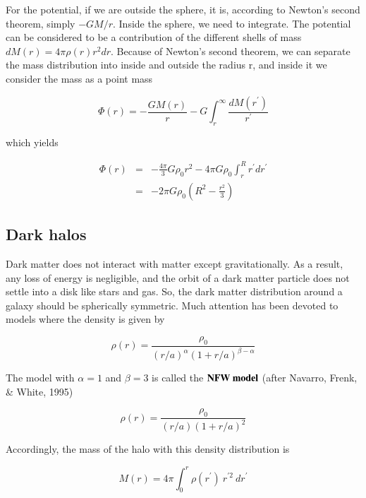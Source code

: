 For the potential, if we are outside the sphere, it is, according to Newton's second theorem, simply $-GM/r$. Inside the sphere, we need to integrate. The potential can be considered to be a contribution of the different shells of mass $dM(r) = 4\pi \rho(r) r^2 dr$. Because of Newton's second theorem, we can separate the mass distribution into inside and outside the radius r, and inside it we consider the mass as a point mass 

\begin{equation}
\varPhi(r) = -\frac{G M(r)}{r} - G\int_r^\infty \frac{dM(r^\prime)}{r^\prime} 
\end{equation}


which yields 


\begin{eqnarray}
\varPhi(r) &=& -\frac{4\pi}{3} G\rho_0 r^2 - 4\pi G \rho_0 \int_r^R r^\prime dr^\prime \\
&=& -2\pi G \rho_0 \left( R^2 - \frac{r^2}{3}\right)
\end{eqnarray}

\subsection{Dark halos}

Dark matter does not interact with matter except gravitationally. As a result, any loss of energy is negligible, and the orbit of a dark matter particle does not settle into a disk like stars and gas. So, the dark matter distribution around a galaxy should be spherically symmetric. Much attention has been devoted to models where the density is given by 


\begin{equation}
\boxed{
\rho(r) = \frac{\rho_0}{(r/a)^\alpha (1+r/a)^{\beta-\alpha}}
}
\end{equation}


The model with $\alpha = 1$ and $\beta=3$ is called the ${\bf NFW \ model}$ (after Navarro, Frenk, \& White, 1995)

\begin{equation}
\rho(r) = \frac{\rho_0}{(r/a) (1+r/a)^2}
\end{equation}


Accordingly, the mass of the halo with this density distribution is 

\begin{equation}
M(r) =  4\pi \int_0^{r} \rho(r^\prime) \ r^{\prime 2} \ dr^\prime 
\end{equation}


